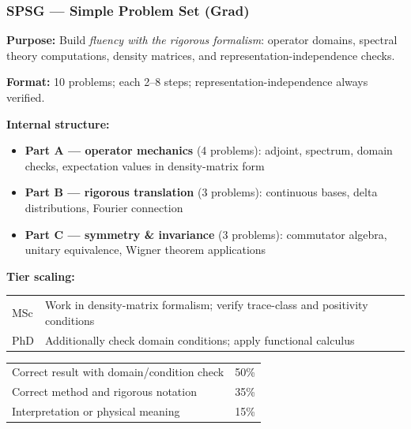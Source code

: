 \documentclass[11pt,a4paper]{article}
\begin{document}
\bigskip
\subsubsection{SPSG --- Simple Problem Set (Grad)}

\begin{tcolorbox}[gradprobbox, title={SPSG --- Simple Problem Set, Graduate \hfill\normalfont 10 problems}]

\textbf{Purpose:} Build \emph{fluency with the rigorous formalism}: operator domains,
spectral theory computations, density matrices, and representation-independence checks.

\medskip\textbf{Format:} 10 problems; each 2--8 steps; representation-independence
always verified.

\medskip\textbf{Internal structure:}
\begin{itemize}[leftmargin=1.5em,itemsep=2pt]
  \item \textbf{Part A --- operator mechanics} (4 problems): adjoint, spectrum,
        domain checks, expectation values in density-matrix form
  \item \textbf{Part B --- rigorous translation} (3 problems): continuous bases,
        delta distributions, Fourier connection
  \item \textbf{Part C --- symmetry \& invariance} (3 problems): commutator algebra,
        unitary equivalence, Wigner theorem applications
\end{itemize}

\medskip\textbf{Tier scaling:}
\begin{center}
\begin{tabular}{lp{8.5cm}}
\toprule
MSc & Work in density-matrix formalism; verify trace-class and positivity conditions\\
PhD & Additionally check domain conditions; apply functional calculus\\
\bottomrule
\end{tabular}
\end{center}
\end{tcolorbox}

\begin{tcolorbox}[rubricbox, title={SPSG Rubric (per problem)}]
\begin{tabular}{ll}
  Correct result with domain/condition check & 50\%\\
  Correct method and rigorous notation       & 35\%\\
  Interpretation or physical meaning         & 15\%\\
\end{tabular}
\end{tcolorbox}
\end{document}
